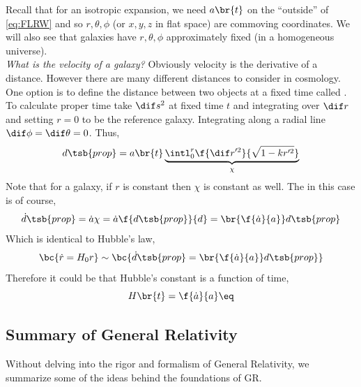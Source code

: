 \documentclass{article}
\begin{document}
Recall that for an isotropic expansion, we need $a\br{t}$ on the ``outside'' of \cref{eq:FLRW} and so $r,\theta,\phi$ (or $x,y,z$ in flat space) are commoving coordinates. We will also see that galaxies have $r, \theta, \phi$ approximately fixed (in a homogeneous universe).\\

\textit{What is the velocity of a galaxy?} Obviously velocity is the derivative of a distance. However there are many different distances to consider in cosmology. One option is to define the distance between two objects at a fixed time called . To calculate proper time take $\dif s^2$ at fixed time $t$ and integrating over $\dif r$ and setting $r=0$ to be the reference galaxy. Integrating along a radial line $\dif \phi = \dif \theta = 0$. Thus,
\[ d\tsb{prop} = a\br{t} \underbrace{\intl_{0}^{r} \f{\dif r'^2}{\sqrt{1 - k r'^2}}}_{\chi} \]
Note that for a galaxy, if $r$ is constant then $\chi$ is constant as well.
The  in this case is of course,
\[ \dot d\tsb{prop} = \dot a \chi = \dot a \f{d\tsb{prop}}{d} = \br{\f{\dot a}{a}} d\tsb{prop} \]
Which is identical to Hubble's law,
\[ \bc{\dot r = H_0 r} \sim \bc{\dot d\tsb{prop} = \br{\f{\dot a}{a}} d\tsb{prop}}  \]
Therefore it could be that Hubble's constant is a function of time,
\[ H\br{t} = \f{\dot a}{a} \eq \label{eq:hubble_scale_factor} \]
\subsection{Summary of General Relativity}
Without delving into the rigor and formalism of General Relativity, we summarize some of the ideas behind the foundations of GR.\\
\end{document}

